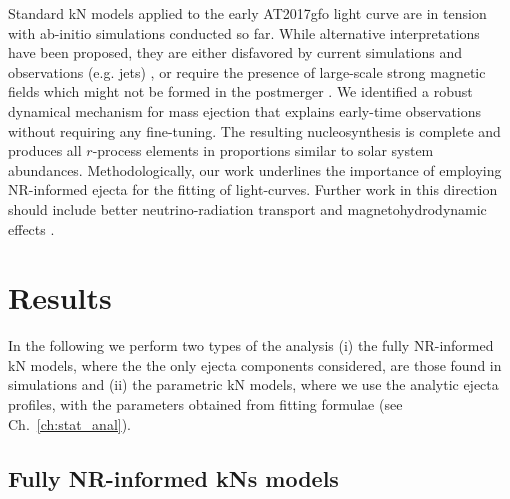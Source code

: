 Standard kN models applied to the early AT2017gfo light curve are in
tension with ab-initio simulations conducted so far.
While alternative interpretations have been proposed, they are either
disfavored by current simulations and observations (e.g. jets) \citep{Bromberg:2017crh,Duffell:2018iig},
or require the presence of large-scale strong magnetic 
fields which might not be formed in the postmerger
\citep{Metzger:2018uni,Fernandez:2018kax,Radice:2018ghv,Ciolfi:2019fie}. 
We identified a robust dynamical mechanism for mass ejection that
explains early-time observations without requiring any fine-tuning.
The resulting nucleosynthesis is complete and produces all
$r$-process elements in proportions similar to solar system abundances.
Methodologically, our work underlines the importance of employing
NR-informed ejecta for the fitting of light-curves.
Further work in this direction should 
include better neutrino-radiation transport and magnetohydrodynamic effects
\citep{Siegel:2017nub,Fujibayashi:2017puw,Radice:2018xqa,Radice:2018pdn,Miller:2019dpt}. 



\section{Results}

In the following we perform two types of the analysis (i) the fully \ac{NR}-informed \ac{kN} models, where the the only ejecta components considered, are those found in simulations and (ii) the parametric \ac{kN} models, where we use the analytic ejecta profiles, with the parameters obtained from fitting formulae (see Ch.~\ref{ch:stat_anal}).


\subsection{Fully \ac{NR}-informed \acp{kN} models}




